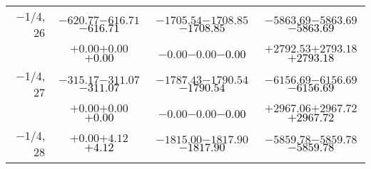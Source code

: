 \documentclass[compress]{beamer}
\begin{document}
\begin{frame}
{\begin{tabular}{r | c | c | c}
$-$1/4, 26 & $-620.77$\hspace{0.1 cm}$-616.71$\hspace{0.1 cm}\textcolor{black}{$-616.71$} & $-1705.54$\hspace{0.1 cm}$-1708.85$\hspace{0.1 cm}\textcolor{black}{$-1708.85$} & $-5863.69$\hspace{0.1 cm}$-5863.69$\hspace{0.1 cm}\textcolor{black}{$-5863.69$} \\
           & $+0.00$\hspace{0.1 cm}$+0.00$\hspace{0.1 cm}\textcolor{black}{$+0.00$} & $-0.00$\hspace{0.1 cm}$-0.00$\hspace{0.1 cm}\textcolor{black}{$-0.00$} & $+2792.53$\hspace{0.1 cm}$+2793.18$\hspace{0.1 cm}\textcolor{black}{$+2793.18$} \\
$-$1/4, 27 & $-315.17$\hspace{0.1 cm}$-311.07$\hspace{0.1 cm}\textcolor{black}{$-311.07$} & $-1787.43$\hspace{0.1 cm}$-1790.54$\hspace{0.1 cm}\textcolor{black}{$-1790.54$} & $-6156.69$\hspace{0.1 cm}$-6156.69$\hspace{0.1 cm}\textcolor{black}{$-6156.69$} \\
           & $+0.00$\hspace{0.1 cm}$+0.00$\hspace{0.1 cm}\textcolor{black}{$+0.00$} & $-0.00$\hspace{0.1 cm}$-0.00$\hspace{0.1 cm}\textcolor{black}{$-0.00$} & $+2967.06$\hspace{0.1 cm}$+2967.72$\hspace{0.1 cm}\textcolor{black}{$+2967.72$} \\
$-$1/4, 28 & $+0.00$\hspace{0.1 cm}$+4.12$\hspace{0.1 cm}\textcolor{black}{$+4.12$} & $-1815.00$\hspace{0.1 cm}$-1817.90$\hspace{0.1 cm}\textcolor{black}{$-1817.90$} & $-5859.78$\hspace{0.1 cm}$-5859.78$\hspace{0.1 cm}\textcolor{black}{$-5859.78$} \\

\end{tabular}}
\end{frame}
\end{document}
